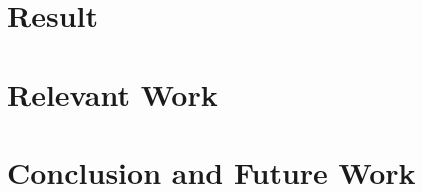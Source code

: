 \documentclass{article}
\begin{document}
\section{Result}

\section{Relevant Work}

\section{Conclusion and Future Work}


\printbibliography
\end{document}

